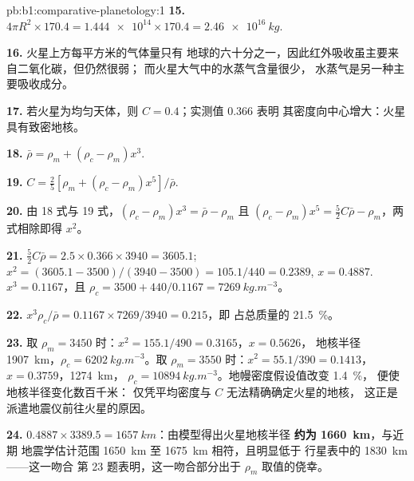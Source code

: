 \begin{solution}{pb:b1:comparative-planetology:1}
\textbf{15.} $4\pi R^2\times170.4 = \num{1.444e14}\times170.4 =
\qty{2.46e16}{kg}$.

\textbf{16.} 火星上方每平方米的气体量只有
地球的六十分之一，因此红外吸收虽主要来自二氧化碳，但仍然很弱；
而火星大气中的水蒸气含量很少，
水蒸气是另一种主要吸收成分。

\textbf{17.} 若火星为均匀天体，则 $C = 0.4$；实测值 0.366 表明
其密度向中心增大：火星具有致密地核。

\textbf{18.} $\bar\rho = \rho_m + (\rho_c - \rho_m)x^3$.

\textbf{19.} $C = \tfrac25[\rho_m + (\rho_c - \rho_m)x^5]/\bar\rho$.

\textbf{20.} 由 18 式与 19 式，$(\rho_c - \rho_m)x^3 = \bar\rho - \rho_m$ 且
$(\rho_c - \rho_m)x^5 = \tfrac52C\bar\rho - \rho_m$，两式相除即得 $x^2$。

\textbf{21.} $\tfrac52C\bar\rho = 2.5\times0.366\times3940 = 3605.1$;
$x^2 = (3605.1 - 3500)/(3940 - 3500) = 105.1/440 = 0.2389$, $x = 0.4887$.
$x^3 = 0.1167$，且 $\rho_c = 3500 + 440/0.1167 = \qty{7269}{kg.m^{-3}}$。

\textbf{22.} $x^3\rho_c/\bar\rho = 0.1167\times7269/3940 = 0.215$，即
占总质量的 \qty{21.5}{\percent}。

\textbf{23.} 取 $\rho_m = 3450$ 时：$x^2 = 155.1/490 = 0.3165$，$x = 0.5626$，
地核半径 \qty{1907}{km}，$\rho_c = \qty{6202}{kg.m^{-3}}$。取 $\rho_m =
3550$ 时：$x^2 = 55.1/390 = 0.1413$，$x = 0.3759$，\qty{1274}{km}，
$\rho_c = \qty{10894}{kg.m^{-3}}$。地幔密度假设值改变 \qty{1.4}{\percent}，
便使地核半径变化数百千米：
仅凭平均密度与 $C$ 无法精确确定火星的地核，
这正是派遣地震仪前往火星的原因。

\textbf{24.} $0.4887\times3389.5 = \qty{1657}{km}$：由模型得出火星地核半径
\textbf{约为 \qty[text-series-to-math=true]{1660}{km}}，与近期
地震学估计范围 \qty{1650}{km} 至 \qty{1675}{km} 相符，且明显低于
行星表中的 \qty{1830}{km}——这一吻合
第 23 题表明，这一吻合部分出于 $\rho_m$ 取值的侥幸。
\end{solution}
